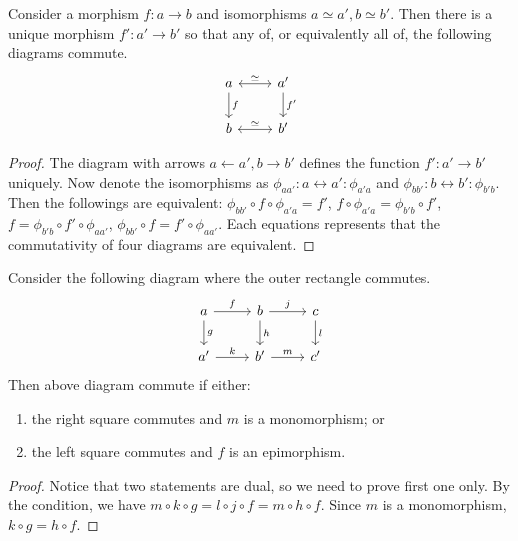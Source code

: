 \begin{lemma} Consider a morphism $f:a\rightarrow b$ and isomorphisms $a\simeq a',b\simeq b'$. Then there is a unique morphism $f':a'\rightarrow b'$ so that any of, or equivalently all of, the following diagrams commute.
\begin{equation}
\begin{tikzcd}
a \arrow{d}{f} \arrow[r,leftrightarrow,"\simeq"] &a'\arrow{d}{f'}\\
b \arrow[r,leftrightarrow,"\simeq"]& b'
\end{tikzcd}
\end{equation}
\end{lemma}
\begin{proof}
The diagram with arrows $a\leftarrow a', b\rightarrow b'$ defines the function $f':a'\rightarrow b'$ uniquely. Now denote the isomorphisms as $\phi_{aa'}:a\leftrightarrow a':\phi_{a'a}$ and $\phi_{bb'}:b\leftrightarrow b':\phi_{b'b}$. Then the followings are equivalent: $\phi_{bb'}\circ f\circ \phi_{a'a}=f'$, $f\circ \phi_{a'a}=\phi_{b'b}\circ f'$, $f=\phi_{b'b}\circ f'\circ \phi_{aa'}$, $\phi_{bb'}\circ f=f'\circ \phi_{aa'}$. Each equations represents that the commutativity of four diagrams are equivalent.
\end{proof}

\begin{lemma} Consider the following diagram where the outer rectangle commutes.
\begin{equation}
\begin{tikzcd}
a\arrow{r}{f} \arrow{d}{g} & b\arrow{r}{j} \arrow{d}{h} & c\arrow{d}{l}\\
a'\arrow{r}{k} & b'\arrow{r}{m} & c'
\end{tikzcd}
\end{equation}
Then above diagram commute if either:
\begin{enumerate}
\item the right square commutes and $m$ is a monomorphism; or
\item the left square commutes and $f$ is an epimorphism.
\end{enumerate}
\end{lemma}
\begin{proof}
Notice that two statements are dual, so we need to prove first one only. By the condition, we have $m\circ k\circ g=l\circ j\circ f=m\circ h\circ f$. Since $m$ is a monomorphism, $k\circ g=h\circ f$.
\end{proof}

